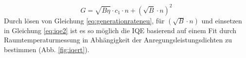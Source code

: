 \begin{equation}
    G = \sqrt{B \eta} \cdot c_1\cdot n + (\sqrt{B} \cdot n)^2
    \label{eq:generationrateneu}
\end{equation}  
Durch lösen von Gleichung \ref{eq:generationrateneu}, für $(\sqrt{B} \cdot n)$ und einsetzen in Gleichung \ref{eq:iqe2} ist es so möglich die IQE basierend auf einem Fit durch Raumtemperaturmessung in Abhängigkeit der Anregungsleistungsdichten zu bestimmen (Abb. \ref{fig:iqert}).


